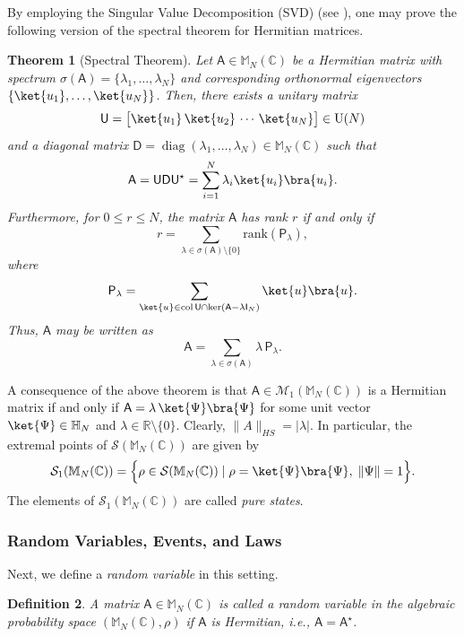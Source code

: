 \documentclass[a4paper,11pt]{article}
\newtheorem{theorem}{Theorem}[section]
\newtheorem{definition}[theorem]{Definition}
\DeclareMathOperator{\diag}{diag}
\newcommand{\rD}{\mathsf{D}}
\newcommand{\rI}{\mathsf{I}}
\newcommand{\rP}{\mathsf{P}}
\newcommand{\rU}{\mathsf{U}}
\newcommand{\rA}{\mathsf{A}}
\begin{document}
By employing the Singular Value Decomposition (SVD) (see \cite[Chapter 4]{Ipsen2009}), one may prove the following version of the spectral theorem for Hermitian matrices.

\begin{theorem}[Spectral Theorem]\label{SVD}
Let \(\rA \in \mathbb{M}_N(\mathbb{C})\) be a Hermitian matrix with spectrum \(\sigma(\rA) = \{\lambda_1, \ldots, \lambda_N\}\) and corresponding orthonormal eigenvectors \(\{\ket{u_1}, \ldots, \ket{u_N}\}\). Then, there exists a unitary matrix 
\[
\rU = \bigl[\ket{u_1}\, \ket{u_2}\, \cdots\, \ket{u_N}\bigr] \in \mathrm{U}(N)
\]
and a diagonal matrix \(\rD = \diag(\lambda_1, \ldots, \lambda_N) \in \mathbb{M}_N(\mathbb{C})\) such that
\[
\rA = \rU \rD \rU^{\star} = \sum_{i=1}^{N} \lambda_i \ket{u_i}\bra{u_i}.
\]
Furthermore, for \(0 \le r \le N\), the matrix \(\rA\) has rank \(r\) if and only if
\[
r = \sum_{\lambda \in \sigma(\rA) \setminus \{0\}} \mathrm{rank}(\rP_\lambda),
\]
where 
\[
\rP_\lambda = \sum_{\ket{u} \in \mathrm{col}\,\rU \cap \ker(\rA-\lambda \rI_N)} \ket{u}\bra{u}.
\]
Thus, \(\rA\) may be written as
\begin{equation}\label{eq:SVD1}
\rA = \sum_{\lambda \in \sigma(\rA)} \lambda\, \rP_\lambda.
\end{equation}
\end{theorem}

A consequence of the above theorem is that $\rA \in \mathcal{M}_1(\mathbb{M}_N(\mathbb{C}))$ is a Hermitian matrix if and only if $\rA = \lambda\, \ket{\Psi}\bra{\Psi}$ for some unit vector $\ket{\Psi} \in \mathbb{H}_N$ and $\lambda \in \mathbb{R}\setminus\{0\}.$ Clearly, \(\|A\|_{HS} = |\lambda|.\) 
In particular, the extremal points of \(\mathcal{S}(\mathbb{M}_N(\mathbb{C}))\) are given by
\[
\mathcal{S}_1(\mathbb{M}_N(\mathbb{C})) = \Bigl\{ \rho \in \mathcal{S}(\mathbb{M}_N(\mathbb{C})) \mid \rho = \ket{\Psi}\bra{\Psi},\; \|\Psi\| = 1 \Bigr\}.
\]
The elements of $\mathcal{S}_1(\mathbb{M}_N(\mathbb{C}))$ are called \emph{pure states}.


\subsubsection{Random Variables, Events, and Laws}

Next, we define a \emph{random variable} in this setting.

\begin{definition}
A matrix $\rA \in \mathbb{M}_N(\mathbb{C})$ is called a random variable in the algebraic probability space \((\mathbb{M}_N(\mathbb{C}), \rho)\) if $\rA$ is Hermitian, i.e., \(\rA = \rA^{\star}\).
\end{definition}
\end{document}
